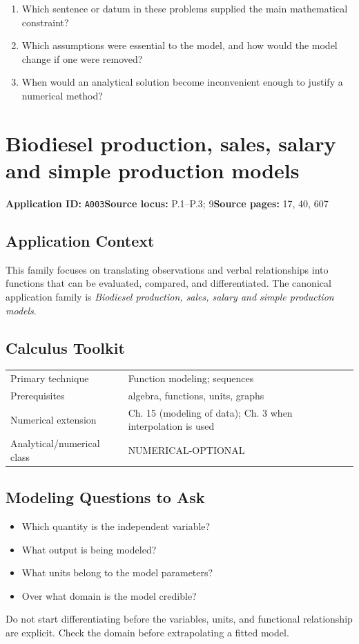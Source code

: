 \documentclass[11pt]{book}
\newcommand{\pid}[1]{\texttt{#1}}
\begin{document}
\begin{reflectionbox}\begin{enumerate}
\item Which sentence or datum in these problems supplied the main mathematical constraint?
\item Which assumptions were essential to the model, and how would the model change if one were removed?
\item When would an analytical solution become inconvenient enough to justify a numerical method?
\end{enumerate}\end{reflectionbox}
\chapter{Biodiesel production, sales, salary and simple production models}\label{app:A003}
\textbf{Application ID:} \pid{A003}\quad \textbf{Source locus:} P.1–P.3; 9\quad \textbf{Source pages:} 17, 40, 607
\section*{Application Context}
This family focuses on translating observations and verbal relationships into functions that can be evaluated, compared, and differentiated. The canonical application family is \emph{Biodiesel production, sales, salary and simple production models}.
\section*{Calculus Toolkit}
\begin{tabularx}{\textwidth}{@{}lX@{}}\toprule
Primary technique & Function modeling; sequences \\
Prerequisites & algebra, functions, units, graphs \\
Numerical extension & Ch. 15 (modeling of data); Ch. 3 when interpolation is used \\
Analytical/numerical class & NUMERICAL-OPTIONAL \\
\bottomrule\end{tabularx}
\section*{Modeling Questions to Ask}\begin{itemize}
\item Which quantity is the independent variable?
\item What output is being modeled?
\item What units belong to the model parameters?
\item Over what domain is the model credible?
\end{itemize}
\begin{errorbox}Do not start differentiating before the variables, units, and functional relationship are explicit. Check the domain before extrapolating a fitted model.\end{errorbox}
\end{document}
